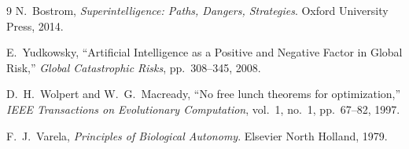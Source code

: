 \documentclass[11pt,a4paper]{article}
\theoremstyle{definition}
\begin{document}
\begin{thebibliography}{9}
N.~Bostrom, \emph{Superintelligence: Paths, Dangers, Strategies}. Oxford University Press, 2014.

E.~Yudkowsky, ``Artificial Intelligence as a Positive and Negative Factor in Global Risk,'' \emph{Global Catastrophic Risks}, pp.~308--345, 2008.

D.~H.~Wolpert and W.~G.~Macready, ``No free lunch theorems for optimization,'' \emph{IEEE Transactions on Evolutionary Computation}, vol.~1, no.~1, pp.~67--82, 1997.

F.~J.~Varela, \emph{Principles of Biological Autonomy}. Elsevier North Holland, 1979.
\end{thebibliography}
\end{document}

